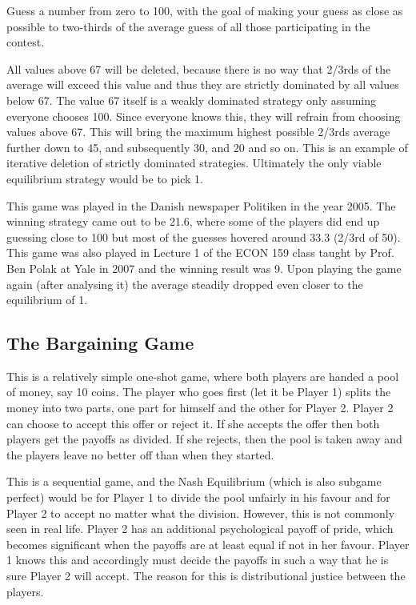 \documentclass[11pt]{article}
\theoremstyle{definition}
\begin{document}
Guess a number from zero to 100, with the goal of making your guess as close as possible to two-thirds of the average guess of all those participating in the contest.

All values above 67 will be deleted, because there is no way that 2/3rds of the average will exceed this value and thus they are strictly dominated by all values below 67. The value 67 itself is a weakly dominated strategy only assuming everyone chooses 100. Since everyone knows this, they will refrain from choosing values above 67. This will bring the maximum highest possible 2/3rds average further down to 45, and subsequently 30, and 20 and so on. This is an example of iterative deletion of strictly dominated strategies. Ultimately the only viable equilibrium strategy would be to pick 1. 

This game was played in the Danish newspaper Politiken in the year 2005. The winning strategy came out to be 21.6, where some of the players did end up guessing close to 100 but most of the guesses hovered around 33.3 (2/3rd of 50). This game was also played in Lecture 1 of the ECON 159 class taught by Prof. Ben Polak at Yale in 2007 and the winning result was 9. Upon playing the game again (after analysing it) the average steadily dropped even closer to the equilibrium of 1.

\subsection{The Bargaining Game}

This is a relatively simple one-shot game, where both players are handed a pool of money, say 10 coins. The player who goes first (let it be Player 1) splits the money into two parts, one part for himself and the other for Player 2. Player 2 can choose to accept this offer or reject it. If she accepts the offer then both players get the payoffs as divided. If she rejects, then the pool is taken away and the players leave no better off than when they started. 

This is a sequential game, and the Nash Equilibrium (which is also subgame perfect) would be for Player 1 to divide the pool unfairly in his favour and for Player 2 to accept no matter what the division. However, this is not commonly seen in real life. Player 2 has an additional psychological payoff of pride, which becomes significant when the payoffs are at least equal if not in her favour. Player 1 knows this and accordingly must decide the payoffs in such a way that he is sure Player 2 will accept. The reason for this is distributional justice between the players.
\end{document}
